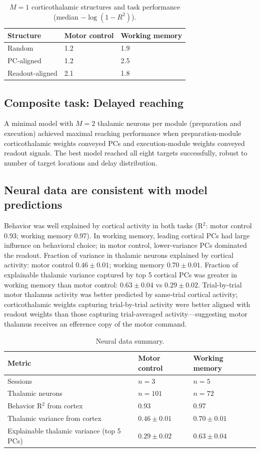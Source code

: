 \documentclass[11pt]{article}
\begin{document}
\begin{table}[h]
\centering
\caption{$M=1$ corticothalamic structures and task performance (median $-\log(1-R^2)$).}
\begin{tabular}{lll}
\toprule
Structure & Motor control & Working memory \\
\midrule
Random & 1.2 & 1.9 \\
PC-aligned & 1.2 & 2.5 \\
Readout-aligned & 2.1 & 1.8 \\
\bottomrule
\end{tabular}
\end{table}

\subsection{Composite task: Delayed reaching}
A minimal model with $M=2$ thalamic neurons per module (preparation and execution) achieved maximal reaching performance when preparation-module corticothalamic weights conveyed PCs and execution-module weights conveyed readout signals. The best model reached all eight targets successfully, robust to number of target locations and delay distribution.

\subsection{Neural data are consistent with model predictions}
Behavior was well explained by cortical activity in both tasks (R$^2$: motor control 0.93; working memory 0.97). In working memory, leading cortical PCs had large influence on behavioral choice; in motor control, lower-variance PCs dominated the readout. Fraction of variance in thalamic neurons explained by cortical activity: motor control $0.46 \pm 0.01$; working memory $0.70 \pm 0.01$. Fraction of explainable thalamic variance captured by top 5 cortical PCs was greater in working memory than motor control: $0.63 \pm 0.04$ vs $0.29 \pm 0.02$. Trial-by-trial motor thalamus activity was better predicted by same-trial cortical activity; corticothalamic weights capturing trial-by-trial activity were better aligned with readout weights than those capturing trial-averaged activity---suggesting motor thalamus receives an efference copy of the motor command.

\begin{table}[h]
\centering
\caption{Neural data summary.}
\begin{tabular}{lll}
\toprule
Metric & Motor control & Working memory \\
\midrule
Sessions & $n=3$ & $n=5$ \\
Thalamic neurons & $n=101$ & $n=72$ \\
Behavior R$^2$ from cortex & 0.93 & 0.97 \\
Thalamic variance from cortex & $0.46 \pm 0.01$ & $0.70 \pm 0.01$ \\
Explainable thalamic variance (top 5 PCs) & $0.29 \pm 0.02$ & $0.63 \pm 0.04$ \\
\bottomrule
\end{tabular}
\end{table}
\end{document}
